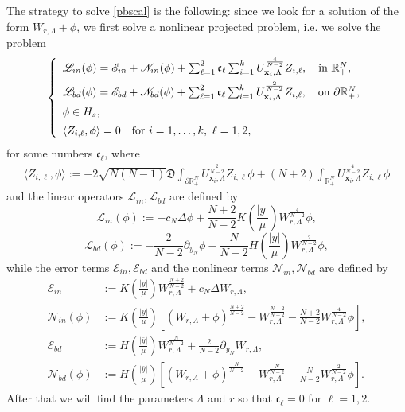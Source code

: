 \documentclass[11pt,a4paper]{amsart}
\begin{document}
The strategy to solve \eqref{pbscal} is the following: since we look for a solution of the form $W_{r,\Lambda} + \phi$, we first solve a nonlinear projected problem, i.e. we solve the problem
\begin{align}\label{eq.intermediate_nonlinear_form}
  \left\{\begin{array}{l}
 \mathscr L_{in}(\phi)    = \mathscr E_{in}+\mathscr N_{in}(\phi) + \sum_{\ell=1}^{2} \mathfrak c_{\ell}\sum_{i=1}^{k} U_{\mathbf{x}_i,\Lambda}^{\frac{4}{N-2}}Z_{i,\ell}, \quad \text{in}~\mathbb{R}_{+}^{N},\vspace{5pt}\\
    \mathscr L_{bd}(\phi) = \mathscr E_{bd}+\mathscr N_{bd}(\phi) + \sum_{\ell=1}^{2} \mathfrak c_{\ell}\sum_{i=1}^{k} U_{\mathbf{x}_i,\Lambda}^{\frac{2}{N-2}}Z_{i,\ell}, \quad \text{on}~ \partial\mathbb{R}_{+}^{N},\vspace{5pt}\\
    \phi \in H_s,\vspace{5pt}\\
    \langle Z_{i, \ell}, \phi\rangle=0 \quad \text{for}~ i=1,\ldots,k, ~ \ell = 1,2,
  \end{array}\right.
\end{align}
for some numbers $\mathfrak c_{\ell}$, where 
\begin{align*}
 \langle Z_{i, \ell}, \phi\rangle:=  -2\sqrt{N(N-1)}\mathfrak D\int_{\partial\mathbb R^N_+}U_{\mathbf{x}_i,\Lambda}^{\frac{2}{N-2}}Z_{i,\ell}\phi +(N+2)\int_{\mathbb R^N_+} U_{\mathbf{x}_i,\Lambda}^{\frac{4}{N-2}}Z_{i,\ell}\phi \end{align*}
and the linear operators $\mathscr L_{in}, \mathscr L_{bd}$ are defined by
$$ \mathscr L_{in}(\phi):=-c_N\Delta \phi +\frac{N+2}{N-2} K\left(\frac{|y|}{\mu}\right) W_{r,\Lambda}^{\frac{4}{N-2}}\phi,$$
$$\mathscr L_{bd}(\phi):=-\frac{2}{N-2}\partial_{y_N}\phi - \frac{N}{N-2} H\left(\frac{|\bar{y}|}{\mu}\right)  W_{r,\Lambda}^{\frac{2}{N-2}}\phi,$$
while the error terms $\mathscr E_{in},\mathscr E_{bd}$ and 
the nonlinear terms $\mathscr N_{in},\mathscr N_{bd}$ are defined by
\begin{align*}
  \mathscr E_{in}&:=K\left(\frac{|y|}{\mu}\right) W_{r,\Lambda}^{\frac{N+2}{N-2}}+c_N \Delta W_{r,\Lambda},\\
  \mathscr N_{in}(\phi)&:=K\left(\frac{|y|}{\mu}\right)\left[{\left(W_{r,\Lambda} + \phi\right)}^{\frac{N+2}{N-2}} - W_{r,\Lambda}^{\frac{N+2}{N-2}} - \frac{N+2}{N-2} W_{r,\Lambda}^{\frac{4}{N-2}}\phi\right],\\
  \mathscr E_{bd}&:=H\left(\frac{|\bar{y}|}{\mu}\right) W_{r,\Lambda}^{\frac{N}{N-2}}+\frac{2}{N-2} \partial_{y_N} W_{r,\Lambda},\\
  \mathscr N_{bd}(\phi)&:=H\left(\frac{|\bar{y}|}{\mu}\right)\left[{\left(W_{r,\Lambda} + \phi\right)}^{\frac{N}{N-2}} - W_{r,\Lambda}^{\frac{N}{N-2}} - \frac{N}{N-2} W_{r,\Lambda}^{\frac{2}{N-2}}\phi\right].
\end{align*}
After that we will find the parameters $\Lambda$ and $r$ so that $\mathfrak c_\ell=0$ for $\ell=1, 2$.\\
\end{document}
